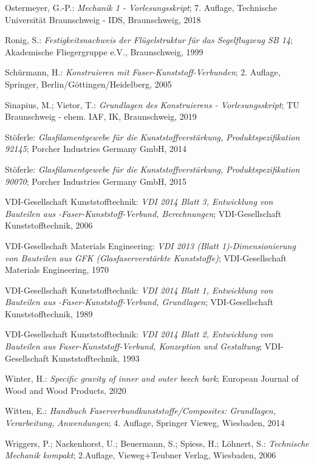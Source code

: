 \begin{thebibliography}{99}
	Ostermeyer, G.-P.:
	\textit{\glqq Mechanik 1 - Vorlesungsskript\grqq};
	7. Auflage, Technische Universität Braunschweig - IDS, Braunschweig, 2018 
	
	Ronig, S.:
	\textit{\glqq Festigkeitsnachweis der Flügelstruktur für das Segelflugzeug SB 14\grqq};
	Akademische Fliegergruppe e.V., Braunschweig, 1999 
	
	Schürmann, H.:
	\textit{\glqq Konstruieren mit Faser-Kunststoff-Verbunden\grqq};
	2. Auflage, Springer, Berlin/Göttingen/Heidelberg, 2005 
	
	Sinapius, M.; Vietor, T.:
	\textit{\glqq Grundlagen des Konstruierens - Vorlesungsskript\grqq};
	TU Braunschweig - ehem. IAF, IK, Braunschweig, 2019
	
	Stöferle:
	\textit{\glqq Glasfilamentgewebe für die Kunststoffverstärkung, Produktspezifikation 92145\grqq};
	Porcher Industries Germany GmbH, 2014
	
	Stöferle:
	\textit{\glqq Glasfilamentgewebe für die Kunststoffverstärkung, Produktspezifikation 90070\grqq};
	Porcher Industries Germany GmbH, 2015
	
	VDI-Gesellschaft Kunststofftechnik:
	\textit{\glqq VDI 2014 Blatt 3, Entwicklung von Bauteilen aus -Faser-Kunststoff-Verbund, Berechnungen\grqq};
	VDI-Gesellschaft Kunststofftechnik, 2006
	
	VDI-Gesellschaft Materials Engineering:
	\textit{\glqq VDI 2013 (Blatt 1)-Dimensionierung von Bauteilen aus GFK (Glasfaserverstärkte Kunststoffe)\grqq};
	VDI-Gesellschaft Materials Engineering, 1970
	
	VDI-Gesellschaft Kunststofftechnik:
	\textit{\glqq VDI 2014 Blatt 1, Entwicklung von Bauteilen aus -Faser-Kunststoff-Verbund, Grundlagen\grqq};
	VDI-Gesellschaft Kunststofftechnik, 1989

	VDI-Gesellschaft Kunststofftechnik:
	\textit{\glqq VDI 2014 Blatt 2, Entwicklung von Bauteilen aus Faser-Kunststoff-Verbund, Konzeption und Gestaltung\grqq};
	VDI-Gesellschaft Kunststofftechnik, 1993 
	
	Winter, H.:
	\textit{\glqq Specific gravity of inner and outer beech bark\grqq};
	European Journal of Wood and Wood Products, 2020
	
	Witten, E.:
	\textit{\glqq Handbuch Faserverbundkunststoffe/Composites: Grundlagen, Verarbeitung, Anwendungen\grqq};
	4. Auflage, Springer Vieweg, Wiesbaden, 2014 
	
	Wriggers, P.; Nackenhorst, U.; Beuermann, S.; Spiess, H.; Löhnert, S.:
	\textit{\glqq Technische Mechanik kompakt\grqq};
	2.Auflage, Vieweg+Teubner Verlag, Wiesbaden, 2006
	
\end{thebibliography}
\endgroup